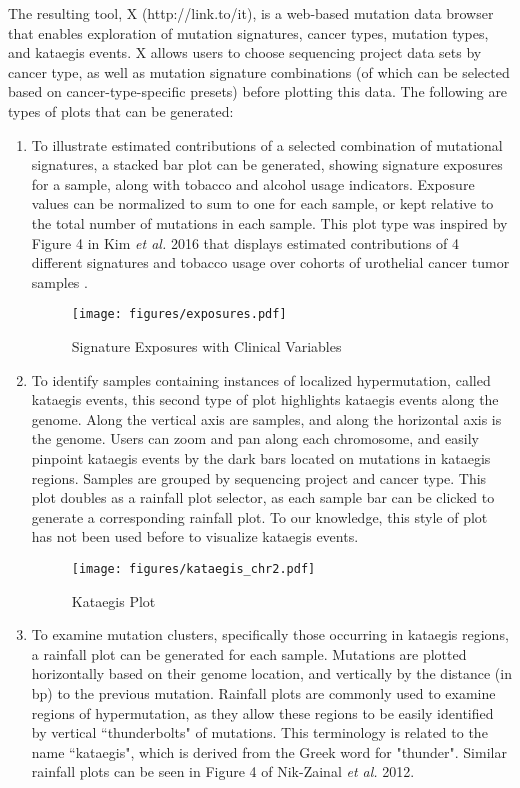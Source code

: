 \documentclass[12pt, letterpaper]{article}
\begin{document}
The resulting tool, X (http://link.to/it), is a web-based mutation data browser that enables exploration of mutation signatures, cancer types, mutation types, and kataegis events.
X allows users to choose sequencing project data sets by cancer type, as well as mutation signature combinations (of which can be selected based on cancer-type-specific presets) before plotting this data. 
The following are types of plots that can be generated:
\begin{enumerate}
\item To illustrate estimated contributions of a selected combination of mutational signatures, a stacked bar plot can be generated, showing signature exposures for a sample, along with tobacco and alcohol usage indicators.
    Exposure values can be normalized to sum to one for each sample, or kept relative to the total number of mutations in each sample.
    This plot type was inspired by Figure 4 in Kim \textit{et al.} 2016 that displays estimated contributions of 4 different signatures and tobacco usage over cohorts of urothelial cancer tumor samples \cite{kim2016somatic}.
    \begin{figure}
        \caption{Signature Exposures with Clinical Variables}
        \centering
        \texttt{[image: figures/exposures.pdf]}
    \end{figure}
\item To identify samples containing instances of localized hypermutation, called kataegis events, this second type of plot highlights kataegis events along the genome.
    Along the vertical axis are samples, and along the horizontal axis is the genome.
    Users can zoom and pan along each chromosome, and easily pinpoint kataegis events by the dark bars located on mutations in kataegis regions.
    Samples are grouped by sequencing project and cancer type.
    This plot doubles as a rainfall plot selector, as each sample bar can be clicked to generate a corresponding rainfall plot.
    To our knowledge, this style of plot has not been used before to visualize kataegis events.
    \begin{figure}
        \caption{Kataegis Plot}
        \centering
        \texttt{[image: figures/kataegis\_chr2.pdf]}
    \end{figure}
\item To examine mutation clusters, specifically those occurring in kataegis regions, a rainfall plot can be generated for each sample.
    Mutations are plotted horizontally based on their genome location, and vertically by the distance (in bp) to the previous mutation.
    Rainfall plots are commonly used to examine regions of hypermutation, as they allow these regions to be easily identified by vertical ``thunderbolts" of mutations. 
    This terminology is related to the name ``kataegis", which is derived from the Greek word for "thunder".
    Similar rainfall plots can be seen in Figure 4 of Nik-Zainal \textit{et al.} 2012\cite{nik2012mutational}.


\end{enumerate}
\end{document}

